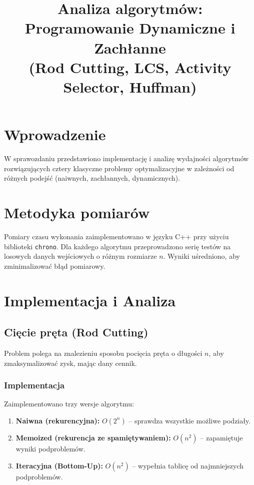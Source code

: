\documentclass{article}
\title{Analiza algorytmów: Programowanie Dynamiczne i Zachłanne\\(Rod Cutting, LCS, Activity Selector, Huffman)}
\author{}
\date{}
\begin{document}
	\maketitle
	
	\section{Wprowadzenie}
	W sprawozdaniu przedstawiono implementację i analizę wydajności algorytmów rozwiązujących cztery klasyczne problemy optymalizacyjne w zależności od różnych podejść (naiwnych, zachłannych, dynamicznych).
	
	\section{Metodyka pomiarów}
	Pomiary czasu wykonania zaimplementowano w języku C++ przy użyciu biblioteki \texttt{chrono}. Dla każdego algorytmu przeprowadzono serię testów na losowych danych wejściowych o różnym rozmiarze $n$. Wyniki uśredniono, aby zminimalizować błąd pomiarowy.
	
	\section{Implementacja i Analiza}
	
	\subsection{Cięcie pręta (Rod Cutting)}
	Problem polega na znalezieniu sposobu pocięcia pręta o długości $n$, aby zmaksymalizować zysk, mając dany cennik.
	
	\subsubsection{Implementacja}
	Zaimplementowano trzy wersje algorytmu:
	\begin{enumerate}
		\item \textbf{Naiwna (rekurencyjna):} $O(2^n)$ – sprawdza wszystkie możliwe podziały.
		\item \textbf{Memoized (rekurencja ze spamiętywaniem):} $O(n^2)$ – zapamiętuje wyniki podproblemów.
		\item \textbf{Iteracyjna (Bottom-Up):} $O(n^2)$ – wypełnia tablicę od najmniejszych podproblemów.
	\end{enumerate}
	\newpage
	
\end{document}
